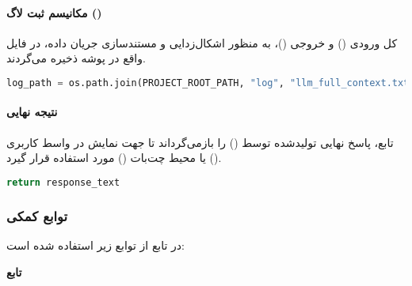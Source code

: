 \documentclass{article}
\begin{document}
\paragraph{مکانیسم ثبت لاگ ()}
کل ورودی () و خروجی ()، به منظور اشکال‌زدایی و مستندسازی جریان داده، در فایل  واقع در پوشه  ذخیره می‌گردند.

\begin{latin}
\begin{lstlisting}[language=Python]
log_path = os.path.join(PROJECT_ROOT_PATH, "log", "llm_full_context.txt")
\end{lstlisting}
\end{latin}

\paragraph{نتیجه نهایی}
تابع، پاسخ نهایی تولیدشده توسط  () را بازمی‌گرداند تا جهت نمایش در واسط کاربری () یا محیط چت‌بات () مورد استفاده قرار گیرد.

\begin{latin}
\begin{lstlisting}[language=Python]
return response_text
\end{lstlisting}
\end{latin}


\subsubsection{توابع کمکی}
در تابع  از توابع زیر استفاده شده است:

\textbf{تابع }
\end{document}
